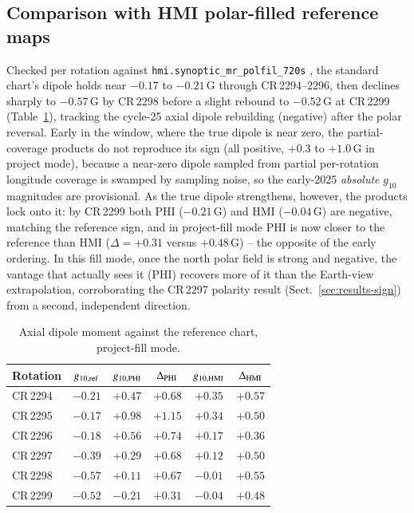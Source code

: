 \documentclass{aa}
\begin{document}
\subsection{Comparison with HMI polar-filled reference maps}
\label{sec:results-reference}

Checked per rotation against \texttt{hmi.synoptic\_mr\_polfil\_720s} \citep{Sun2018}, the standard chart's dipole holds near $-0.17$ to $-0.21$\,G through CR\,2294--2296, then declines sharply to $-0.57$\,G by CR\,2298 before a slight rebound to $-0.52$\,G at CR\,2299 (Table~\ref{tab:reference}), tracking the cycle-25 axial dipole rebuilding (negative) after the polar reversal. Early in the window, where the true dipole is near zero, the partial-coverage products do not reproduce its sign (all positive, $+0.3$ to $+1.0$\,G in project mode), because a near-zero dipole sampled from partial per-rotation longitude coverage is swamped by sampling noise, so the early-2025 \emph{absolute} $g_{10}$ magnitudes are provisional. As the true dipole strengthens, however, the products lock onto it: by CR\,2299 both PHI ($-0.21$\,G) and HMI ($-0.04$\,G) are negative, matching the reference sign, and in project-fill mode PHI is now closer to the reference than HMI ($\Delta = +0.31$ versus $+0.48$\,G) -- the opposite of the early ordering. In this fill mode, once the north polar field is strong and negative, the vantage that actually sees it (PHI) recovers more of it than the Earth-view extrapolation, corroborating the CR\,2297 polarity result (Sect.~\ref{sec:results-sign}) from a second, independent direction.

\begin{table}
\caption{Axial dipole moment against the reference chart, project-fill mode.}
\label{tab:reference}
\centering
\footnotesize
\begin{tabular}{lccccc}
\hline\hline
Rotation & $g_{10,\rm ref}$ & $g_{10,\rm PHI}$ & $\Delta_{\rm PHI}$ & $g_{10,\rm HMI}$ & $\Delta_{\rm HMI}$ \\
\hline
CR\,2294 & $-0.21$ & $+0.47$ & $+0.68$ & $+0.35$ & $+0.57$ \\
CR\,2295 & $-0.17$ & $+0.98$ & $+1.15$ & $+0.34$ & $+0.50$ \\
CR\,2296 & $-0.18$ & $+0.56$ & $+0.74$ & $+0.17$ & $+0.36$ \\
CR\,2297 & $-0.39$ & $+0.29$ & $+0.68$ & $+0.12$ & $+0.50$ \\
CR\,2298 & $-0.57$ & $+0.11$ & $+0.67$ & $-0.01$ & $+0.55$ \\
CR\,2299 & $-0.52$ & $-0.21$ & $+0.31$ & $-0.04$ & $+0.48$ \\
\hline
\end{tabular}
\end{table}
\end{document}
